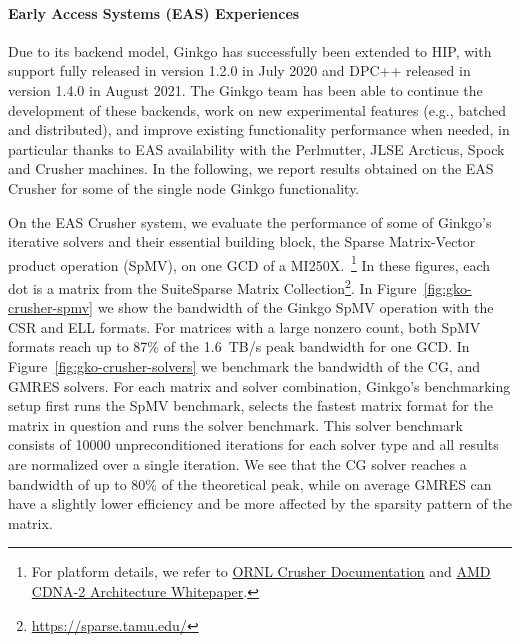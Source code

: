 \paragraph{Early Access Systems (EAS) Experiences}
Due to its backend model, Ginkgo has successfully been extended to HIP, with
support fully released in version 1.2.0 in July 2020 and DPC++ released in
version 1.4.0 in August 2021. The Ginkgo team has been able to continue the
development of these backends, work on new experimental features (e.g., batched
and distributed), and improve existing functionality performance when needed, in
particular thanks to EAS availability with the Perlmutter, JLSE Arcticus, Spock
and Crusher machines. In the following, we report results obtained on the EAS
Crusher for some of the single node Ginkgo functionality.

On the EAS Crusher system, we evaluate the performance of some of Ginkgo's
iterative solvers and their essential building block, the Sparse Matrix-Vector
product operation (SpMV), on one GCD of a MI250X.~\footnote{For platform
  details, we refer to
  \href{https://docs.olcf.ornl.gov/systems/crusher_quick_start_guide.html}{ORNL
    Crusher Documentation} and
  \href{https://www.amd.com/system/files/documents/amd-cdna2-white-paper.pdf}{AMD
    CDNA-2 Architecture Whitepaper}.} In these figures, each dot is a matrix
from the SuiteSparse Matrix Collection\footnote{\url{https://sparse.tamu.edu/}}.
In Figure~\ref{fig:gko-crusher-spmv} we show the bandwidth of the Ginkgo SpMV
operation with the CSR and ELL formats. For matrices with a large nonzero count,
both SpMV formats reach up to 87\% of the 1.6~TB/s peak bandwidth for one GCD.
In Figure~\ref{fig:gko-crusher-solvers} we benchmark the bandwidth of the CG,
and GMRES solvers. For each matrix and solver combination, Ginkgo's benchmarking 
setup first runs the SpMV benchmark, selects the fastest matrix format for the matrix
in question and runs the solver benchmark. This solver benchmark consists of 10000
unpreconditioned iterations for each solver type and all results are normalized over a
single iteration. We see that the CG solver reaches a bandwidth of up to 80\% of the
theoretical peak, while on average GMRES can have a slightly lower efficiency and be
more affected by the sparsity pattern of the matrix.




